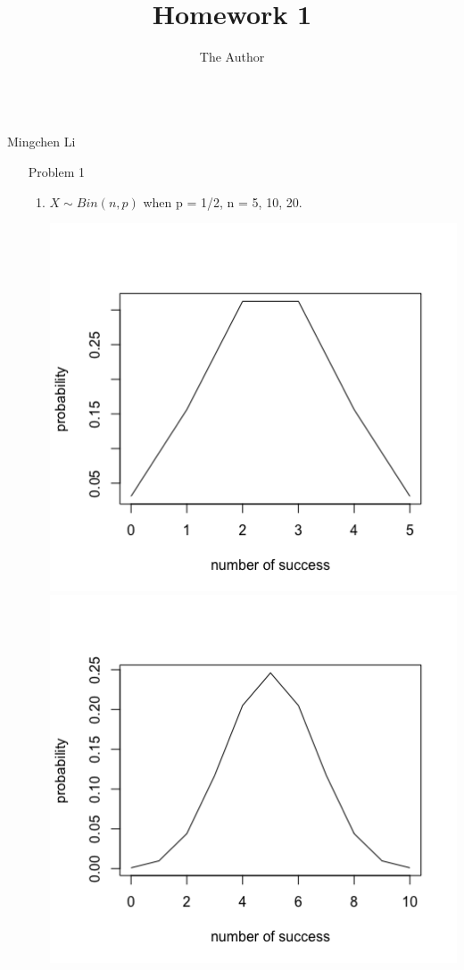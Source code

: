 \documentclass[11pt, oneside]{article}
\title{Homework 1}
\author{The Author}
\begin{document}
\begin{center}\\Mingchen Li\\ \end{center}

\begin{enumerate}
    \item[Problem 1] 
    \begin{enumerate}
        \item $X \sim Bin(n, p)$ when p = 1/2, n = 5, 10, 20.

        \includegraphics[scale=0.3]{111}
        \includegraphics[scale=0.3]{112}

\end{enumerate}
\end{enumerate}
\end{document}
